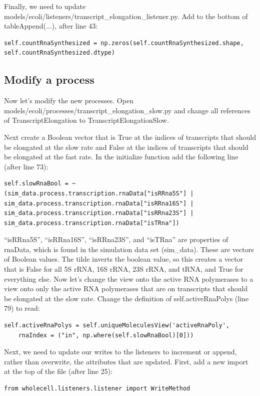 \documentclass[12pt]{article}
\begin{document}
Finally, we need to update models/ecoli/listeners/transcript_elongation_listener.py. Add to the bottom of tableAppend(...), after line 43:
\lstset{language=Python}
\begin{lstlisting}
self.countRnaSynthesized = np.zeros(self.countRnaSynthesized.shape, self.countRnaSynthesized.dtype)
\end{lstlisting}

\subsection{Modify a process}

Now let’s modify the new processes. Open models/ecoli/processes/transcript\_elongation\_slow.py and change all references of TranscriptElongation to TranscriptElongationSlow.

Next create a Boolean vector that is True at the indices of transcripts that should be elongated at the slow rate and False at the indices of transcripts that should be elongated at the fast rate. In the initialize function add the following line (after line 73):

\lstset{language=Python}
\begin{lstlisting}
self.slowRnaBool = ~(sim_data.process.transcription.rnaData["isRRna5S"] | sim_data.process.transcription.rnaData["isRRna16S"] | sim_data.process.transcription.rnaData["isRRna23S"] | sim_data.process.transcription.rnaData["isTRna"])
\end{lstlisting}

“isRRna5S”, “isRRna16S”, “isRRna23S”, and “isTRna” are properties of rnaData, which is found in the simulation data set (sim_data). These are vectors of Boolean values. The tilde inverts the boolean value, so this creates a vector that is False for all 5S rRNA, 16S rRNA, 23S rRNA, and tRNA, and True for everything else.
Now let’s change the view onto the active RNA polymerases to a view onto only the active RNA polymerases that are on transcripts that should be elongated at the slow rate. Change the definition of self.activeRnaPolys (line 79) to read:

\begin{lstlisting}
self.activeRnaPolys = self.uniqueMoleculesView('activeRnaPoly',
	rnaIndex = ("in", np.where(self.slowRnaBool)[0]))
\end{lstlisting}

Next, we need to update our writes to the listeners to increment or append, rather than overwrite, the attributes that are updated. First, add a new import at the top of the file (after line 25):
\begin{lstlisting}
from wholecell.listeners.listener import WriteMethod
\end{lstlisting}
\end{document}
